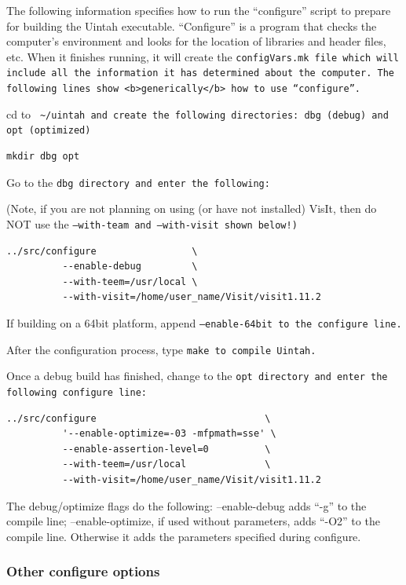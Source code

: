 \documentclass[12pt]{article}
\newcommand{\TT}[1]{\tt{#1} \normalfont}
\begin{document}
The following information specifies how to run the ``configure''
script to prepare for building the Uintah executable.  ``Configure''
is a program that checks the computer's environment and looks for the
location of libraries and header files, etc.  When it finishes
running, it will create the \TT{configVars.mk} file which will include all
the information it has determined about the computer.  The following
lines show <b>generically</b> how to use ``configure''.

cd to \TT{ \textasciitilde/uintah} and create the following directories:
\TT{dbg} (debug) and \TT{opt} (optimized)

\begin{verbatim}
mkdir dbg opt
\end{verbatim}

Go to the \TT{dbg} directory and enter the following:

(Note, if you are not planning on using (or have not installed) VisIt,
then do NOT use the \TT{--with-team} and \TT{--with-visit} shown below!)

\begin{verbatim}
../src/configure                 \
          --enable-debug         \
          --with-teem=/usr/local \
          --with-visit=/home/user_name/Visit/visit1.11.2
\end{verbatim}

If building on a 64bit platform, append \TT{--enable-64bit} to the
configure line.

After the configuration process, type \TT{make} to compile Uintah.

Once a debug build has finished, change to the \TT{opt} directory and
enter the following configure line:

\begin{verbatim}
../src/configure                              \
          '--enable-optimize=-03 -mfpmath=sse' \
          --enable-assertion-level=0          \
          --with-teem=/usr/local              \
          --with-visit=/home/user_name/Visit/visit1.11.2
\end{verbatim}

The debug/optimize flags do the following:  --enable-debug adds ``-g''
to the compile line; --enable-optimize, if used without parameters,
adds ``-O2'' to the compile line.  Otherwise it adds the parameters
specified during configure.

\subsubsection{Other configure options}
\end{document}
